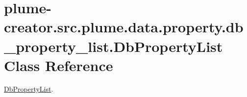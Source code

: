 \hypertarget{classplume-creator_1_1src_1_1plume_1_1data_1_1property_1_1db__property__list_1_1_db_property_list}{}\section{plume-\/creator.src.\+plume.\+data.\+property.\+db\+\_\+property\+\_\+list.\+Db\+Property\+List Class Reference}
\label{classplume-creator_1_1src_1_1plume_1_1data_1_1property_1_1db__property__list_1_1_db_property_list}


\hyperlink{classplume-creator_1_1src_1_1plume_1_1data_1_1property_1_1db__property__list_1_1_db_property_list}{Db\+Property\+List}.  


